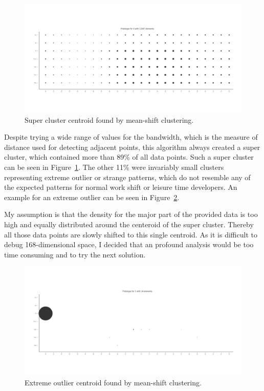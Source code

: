 \begin{figure}[H]
    \includegraphics[scale=0.32]{./graphs/analysis-mean-shift/supercluster}
    \centering
    \caption{Super cluster centroid found by mean-shift clustering.}\label{fig:mean-shift-super-cluster}
\end{figure}


Despite trying a wide range of values for the bandwidth, which is the measure of distance used for detecting adjacent points, this algorithm always created a super cluster, which contained more than 89\% of all data points. Such a super cluster can be seen in Figure~\ref{fig:mean-shift-super-cluster}.
The other 11\% were invariably small clusters representing extreme outlier or strange patterns, which do not resemble any of the expected patterns for normal work shift or leisure time developers.
An example for an extreme outlier can be seen in Figure~\ref{fig:mean-shift-outlier}.

My assumption is that the density for the major part of the provided data is too high and equally distributed around the centeroid of the super cluster.
Thereby all those data points are slowly shifted to this single centroid.
As it is difficult to debug 168-dimensional space, I decided that an profound analysis would be too time consuming and to try the next solution.

\begin{figure}[H]
    \includegraphics[scale=0.32]{./graphs/analysis-mean-shift/outlier}
    \centering
    \caption{Extreme outlier centroid found by mean-shift clustering.}\label{fig:mean-shift-outlier}
\end{figure}

